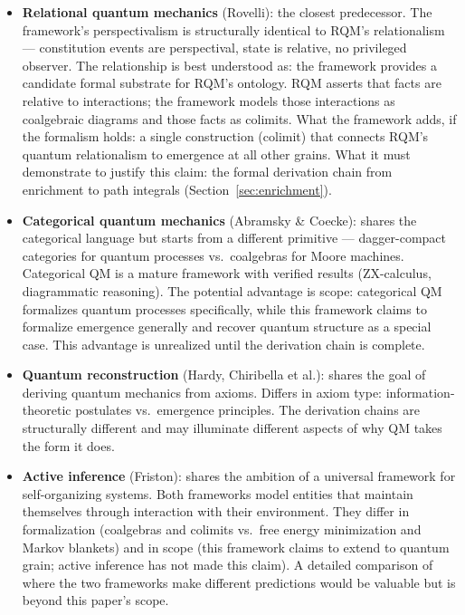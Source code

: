 \documentclass[12pt,a4paper]{article}
\begin{document}
\begin{itemize}
  \item \textbf{Relational quantum mechanics} (Rovelli): the closest predecessor. The framework's perspectivalism is structurally identical to RQM's relationalism --- constitution events are perspectival, state is relative, no privileged observer. The relationship is best understood as: the framework provides a candidate formal substrate for RQM's ontology. RQM asserts that facts are relative to interactions; the framework models those interactions as coalgebraic diagrams and those facts as colimits. What the framework adds, if the formalism holds: a single construction (colimit) that connects RQM's quantum relationalism to emergence at all other grains. What it must demonstrate to justify this claim: the formal derivation chain from enrichment to path integrals (Section~\ref{sec:enrichment}).

  \item \textbf{Categorical quantum mechanics} (Abramsky \& Coecke): shares the categorical language but starts from a different primitive --- dagger-compact categories for quantum processes vs.\ coalgebras for Moore machines. Categorical QM is a mature framework with verified results (ZX-calculus, diagrammatic reasoning). The potential advantage is scope: categorical QM formalizes quantum processes specifically, while this framework claims to formalize emergence generally and recover quantum structure as a special case. This advantage is unrealized until the derivation chain is complete.

  \item \textbf{Quantum reconstruction} (Hardy, Chiribella et al.): shares the goal of deriving quantum mechanics from axioms. Differs in axiom type: information-theoretic postulates vs.\ emergence principles. The derivation chains are structurally different and may illuminate different aspects of why QM takes the form it does.

  \item \textbf{Active inference} (Friston): shares the ambition of a universal framework for self-organizing systems. Both frameworks model entities that maintain themselves through interaction with their environment. They differ in formalization (coalgebras and colimits vs.\ free energy minimization and Markov blankets) and in scope (this framework claims to extend to quantum grain; active inference has not made this claim). A detailed comparison of where the two frameworks make different predictions would be valuable but is beyond this paper's scope.


\end{itemize}
\end{document}
